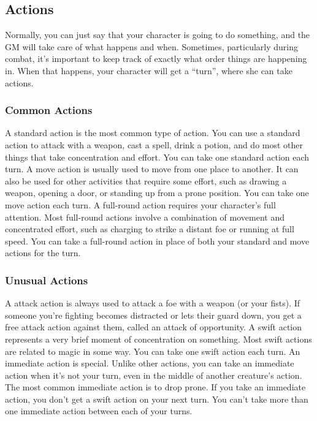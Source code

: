 \subsection{Actions}
Normally, you can just say that your character is going to do something, and the GM will take care of what happens and when. Sometimes, particularly during combat, it's important to keep track of exactly what order things are happening in. When that happens, your character will get a ``turn'', where she can take actions.

\subsubsection{Common Actions}
 A standard action is the most common type of action. You can use a standard action to attack with a weapon, cast a spell, drink a potion, and do most other things that take concentration and effort. You can take one standard action each turn.
 A move action is usually used to move from one place to another. It can also be used for other activities that require some effort, such as drawing a weapon, opening a door, or standing up from a prone position. You can take one move action each turn.
 A full-round action requires your character's full attention. Most full-round actions involve a combination of movement and concentrated effort, such as charging to strike a distant foe or running at full speed. You can take a full-round action in place of both your standard and move actions for the turn.

\subsubsection{Unusual Actions}
 A attack action is always used to attack a foe with a weapon (or your fists). If someone you're fighting becomes distracted or lets their guard down, you get a free attack action against them, called an attack of opportunity.
 A swift action represents a very brief moment of concentration on something. Most swift actions are related to magic in some way. You can take one swift action each turn.
 An immediate action is special. Unlike other actions, you can take an immediate action when it's not your turn, even in the middle of another creature's action. The most common immediate action is to drop prone. If you take an immediate action, you don't get a swift action on your next turn. You can't take more than one immediate action between each of your turns.

